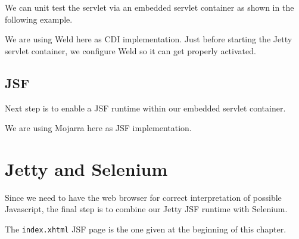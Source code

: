 We can unit test the servlet via an embedded servlet container as shown in the following example.

We are using Weld here as CDI implementation.
Just before starting the Jetty servlet container, we configure Weld so it can get properly activated.

\subsection{JSF}

Next step is to enable a JSF runtime within our embedded servlet container.

We are using Mojarra here as JSF implementation.

\section{Jetty and Selenium}
Since we need to have the web browser for correct interpretation of possible Javascript, the final step is to combine our Jetty JSF runtime with Selenium.

The \texttt{index.xhtml} JSF page is the one given at the beginning of this chapter.